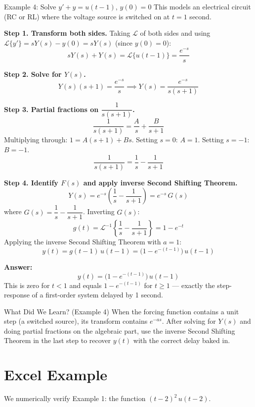\documentclass[12pt,a4paper]{article}
\begin{document}
\begin{infobox}{Example 4: Solve $y' + y = u(t-1)$, $y(0) = 0$}
This models an electrical circuit (RC or RL) where the voltage source is switched on
at $t = 1$ second.

\textbf{Step 1. Transform both sides.}
Taking $\mathcal{L}$ of both sides and using $\mathcal{L}\{y'\} = sY(s) - y(0) = sY(s)$
(since $y(0) = 0$):
\[
  sY(s) + Y(s) = \mathcal{L}\{u(t-1)\} = \frac{e^{-s}}{s}
\]

\textbf{Step 2. Solve for $Y(s)$.}
\[
  Y(s)(s+1) = \frac{e^{-s}}{s}
  \implies
  Y(s) = \frac{e^{-s}}{s(s+1)}
\]

\textbf{Step 3. Partial fractions on $\dfrac{1}{s(s+1)}$.}
\[
  \frac{1}{s(s+1)} = \frac{A}{s} + \frac{B}{s+1}
\]
Multiplying through: $1 = A(s+1) + Bs$.
Setting $s = 0$: $A = 1$.
Setting $s = -1$: $B = -1$.
\[
  \frac{1}{s(s+1)} = \frac{1}{s} - \frac{1}{s+1}
\]

\textbf{Step 4. Identify $F(s)$ and apply inverse Second Shifting Theorem.}
\[
  Y(s) = e^{-s}\!\left(\frac{1}{s} - \frac{1}{s+1}\right) = e^{-s}\,G(s)
\]
where $G(s) = \dfrac{1}{s} - \dfrac{1}{s+1}$.
Inverting $G(s)$:
\[
  g(t) = \mathcal{L}^{-1}\!\left\{\frac{1}{s} - \frac{1}{s+1}\right\} = 1 - e^{-t}
\]
Applying the inverse Second Shifting Theorem with $a = 1$:
\[
  y(t) = g(t-1)\,u(t-1) = \bigl(1 - e^{-(t-1)}\bigr)\,u(t-1)
\]

\textbf{Answer:}
\[
  \boxed{y(t) = \bigl(1 - e^{-(t-1)}\bigr)\,u(t-1)}
\]
This is zero for $t < 1$ and equals $1 - e^{-(t-1)}$ for $t \geq 1$ --- exactly the
step-response of a first-order system delayed by 1 second.
\end{infobox}

\begin{learnbox}{What Did We Learn? (Example 4)}
When the forcing function contains a unit step (a switched source), its transform contains
$e^{-as}$.
After solving for $Y(s)$ and doing partial fractions on the algebraic part, use the inverse
Second Shifting Theorem in the last step to recover $y(t)$ with the correct delay baked in.
\end{learnbox}

\section{Excel Example}

We numerically verify Example 1: the function $(t-2)^2\,u(t-2)$.
\end{document}
